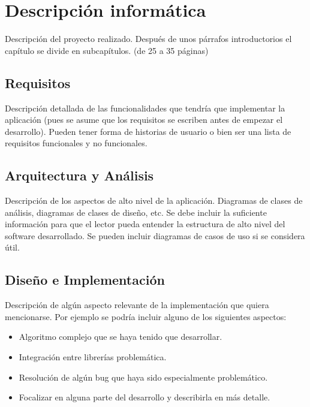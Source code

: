\cleardoublepage
\chapter{Descripción informática}

Descripción del proyecto realizado. Después de unos párrafos introductorios el capítulo se divide en subcapítulos. (de 25 a 35 páginas)

\section{Requisitos}
\label{sec:requisitos}

Descripción detallada de las funcionalidades que tendría que implementar la aplicación (pues se asume que los requisitos se escriben antes de empezar el desarrollo). Pueden tener forma de historias de usuario o bien ser una lista de requisitos funcionales y no funcionales.

\section{Arquitectura y Análisis}
\label{sec:arquitectura-analisis}

Descripción de los aspectos de alto nivel de la aplicación. Diagramas de clases de análisis, diagramas de clases de diseño, etc. Se debe incluir la suficiente información para que el lector pueda entender la estructura de alto nivel del software desarrollado. Se pueden incluir diagramas de casos de uso si se considera útil.

\section{Diseño e Implementación}
\label{sec:diseno-implementacion}

Descripción de algún aspecto relevante de la implementación que quiera mencionarse. Por ejemplo se podría incluir alguno de los siguientes aspectos:
\begin{itemize}
  \item Algoritmo complejo que se haya tenido que desarrollar.
  \item Integración entre librerías problemática.
  \item Resolución de algún bug que haya sido especialmente problemático.
  \item Focalizar en alguna parte del desarrollo y describirla en más detalle.
\end{itemize}

